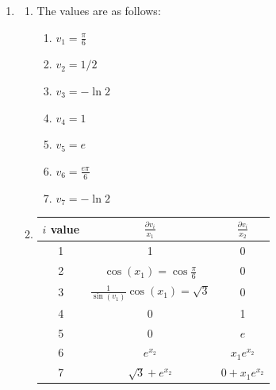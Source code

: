 \documentclass[submit]{harvardml}
\newenvironment{ans}{
  \begin{enumerate}
  \color{blue}
}{
  \end{enumerate}
  \color{black}
}
\begin{document}
\begin{ans}
\begin{enumerate}
$$        $$
        Plugging in, we have
        $$
        (\frac{1 - y}{1 - \hat y}-\frac{y}{\hat y}) \cdot \sigma(a_2)(1 - \sigma(a_2))\cdot W_2^{1, h} \cdot\sigma(a_1^h)(1 - \sigma(a_1^h))
        $$
        \item By Chain Rule,
        $$
         \frac{\partial L}{\partial W_1^{h, m}} = \frac{\partial L}{\partial \hat y} \frac{\partial \hat y}{\partial a_2} \frac{\partial a_2}{\partial z_1^h}\frac{\partial z_1^h}{\partial a_1^h}\frac{a_1^h}{W_1^{h, m}}
        $$
        We have
        $$
        = (\frac{1 - y}{1 - \hat y}-\frac{y}{\hat y}) \cdot \sigma(a_2)(1 - \sigma(a_2)) \cdot W_2^{1, h}\cdot \sigma(a_1^h)(1-\sigma(a_1^{h})\cdot X_{m, 1}
        $$
    \end{enumerate}
    \item
    \begin{enumerate}
    \item The values are as follows:
    \newline
     \begin{enumerate}
        \item $v_1 = \frac{\pi}{6}$
        \item $v_2 = 1/2$
        \item $v_3 = -\ln 2$
        \item $v_4 = 1$
        \item $v_5 = e$
        \item $v_6 = \frac{e\pi}{6}$
        \item $v_7 = -\ln 2 $
    \end{enumerate}
    \newpage
    \item 
    \begin{tabular}{|c|c|c|}
        \hline
        $i$ value & $\frac{\partial v_i}{x_1}$ & $\frac{\partial v_i}{x_2}$ \\
        \hline
        1 & 1 & 0 \\
        2 & $\cos(x_1) = \cos\frac{\pi}{6}$ & 0 \\
        3 & $\frac{1}{\sin(v_1)}\cos(x_1) = \sqrt 3$ & $0$\\
        4 & 0 & 1 \\
        5 & 0 & $e$ \\ 
        6 & $e^{x_2}$ & $x_1e^{x_2}$ \\ 
        7 & $\sqrt 3 + e^{x_2}$ & $0 + x_1e^{x_2}$\\
        \hline
    
        \end{tabular}
    \end{enumerate}
\end{ans}
\end{document}
